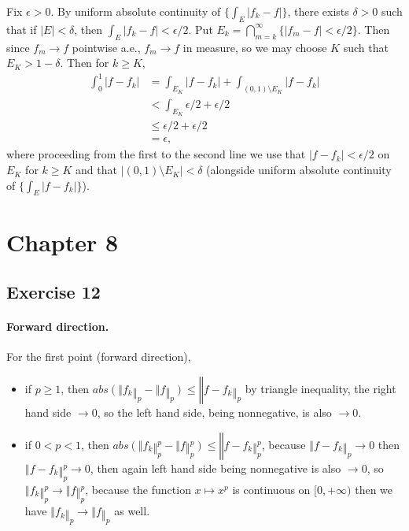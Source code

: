 \documentclass{article}
\newcommand\abs[1]{\left|#1\right|}
\begin{document}
Fix $\epsilon > 0$. By uniform absolute continuity of $\{ \int_{E} \abs{f_{k} - f} \}$, there exists $\delta > 0$ such that if $\abs{E} < \delta$, then $\int_{E} \abs{f_{k} - f} < \epsilon / 2$. Put $E_{k} = \bigcap_{m=k}^{\infty} \{ \abs{f_{m} - f} < \epsilon / 2 \}$. Then since $f_{m} \rightarrow f$ pointwise a.e., $f_{m} \rightarrow f$ in measure, so we may choose $K$ such that $E_{K} > 1 - \delta$. Then for $k \geq K$, 
\begin{align*}
	\int_{0}^{1} \abs{f - f_{k}} &= \int_{E_{K}} \abs{f - f_{k}} + \int_{(0, 1) \setminus E_{K}} \abs{f - f_{k}} \\
	&< \int_{E_{K}} \epsilon / 2 + \epsilon / 2 \\
	&\leq \epsilon / 2 + \epsilon / 2 \\
	&= \epsilon, 
\end{align*}
where proceeding from the first to the second line we use that $\abs{f - f_{k}} < \epsilon / 2$ on $E_{K}$ for $k \geq K$ and that $\abs{(0, 1) \setminus E_{K}} < \delta$ (alongside uniform absolute continuity of $\{\int_{E} \abs{f - f_{k}}\}$).

\section{Chapter 8}
\subsection{Exercise 12}%

\typstmathinputenable{\$}
\paragraph{Forward direction.} For the first point (forward direction),
\begin{itemize}
    \item if $p ≥ 1$, then 
        $ abs(‖f_k‖_p - ‖f‖_p) ≤ ‖f-f_k‖_p $
        by triangle inequality,
        the right hand side $→ 0$, so the left hand side, being nonnegative, is also $→ 0$.
    \item if $0<p<1$, then $abs( ‖f_k‖_p^p - ‖f‖_p^p ) ≤ ‖f-f_k‖_p^p$, because $‖f-f_k‖_p→ 0$ then $‖f-f_k‖_p^p→ 0$, then again left hand side being nonnegative is also $→ 0$, so $‖f_k‖_p^p → ‖f‖_p^p$, because the function $x ↦ x^p$ is continuous on $[0,+∞)$ then we have $‖f_k‖_p → ‖f‖_p$ as well.
\end{itemize}
\end{document}
